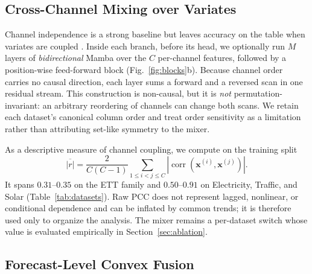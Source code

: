 \documentclass[review,12pt]{elsarticle}
\begin{document}
\subsection{Cross-Channel Mixing over Variates}
\label{sec:mixer}

Channel independence is a strong baseline \cite{patchtst,dlinear} but
leaves accuracy on the table when variates are coupled
\cite{itransformer,smamba,crossformer}. Inside each branch, before its
head, we optionally run $M$ layers of \emph{bidirectional} Mamba over the
$C$ per-channel features, followed by a position-wise feed-forward block
(Fig.~\ref{fig:blocks}b). Because channel order carries no causal direction,
each layer sums a forward and a reversed scan in one residual stream. This
construction is non-causal, but it is \emph{not} permutation-invariant: an
arbitrary reordering of channels can change both scans. We retain each
dataset's canonical column order and treat order sensitivity as a limitation
rather than attributing set-like symmetry to the mixer.

As a descriptive measure of channel coupling, we compute on the training
split
\begin{equation}
\overline{|r|}
=\frac{2}{C(C-1)}\sum_{1\le i<j\le C}
\left|\operatorname{corr}(\mathbf{x}^{(i)},\mathbf{x}^{(j)})\right|.
\label{eq:pcc}
\end{equation}
It spans $0.31$--$0.35$ on the ETT family and $0.50$--$0.91$ on
Electricity, Traffic, and Solar (Table~\ref{tab:datasets}). Raw PCC does not
represent lagged, nonlinear, or conditional dependence and can be inflated
by common trends; it is therefore used only to organize the analysis. The
mixer remains a per-dataset switch whose value is evaluated empirically in
Section~\ref{sec:ablation}.

\subsection{Forecast-Level Convex Fusion}
\label{sec:fusion}
\end{document}
